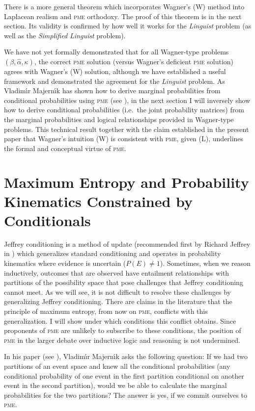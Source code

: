 \documentclass[phd,12pt,oneside]{ubcthesis}
\begin{document}
There is a more general theorem which incorporates Wagner's (W) method
into Laplacean realism and \textsc{pme} orthodoxy. The proof of this
theorem is in the next section. Its validity is confirmed by how well
it works for the \emph{Linguist} problem (as well as the
\emph{Simplified Linguist} problem).

We have not yet formally demonstrated that for all Wagner-type
problems $(\beta,\hat{\alpha},\kappa)$, the correct \textsc{pme}
solution (versus Wagner's deficient \textsc{pme} solution) agrees with
Wagner's (W) solution, although we have established a useful framework
and demonstrated the agreement for the \emph{Linguist} problem. As
Vladim{\'\i}r Majern{\'\i}k has shown how to derive marginal
probabilities from conditional probabilities using \textsc{pme} (see
), in the next section I will inversely show
how to derive conditional probabilities (i.e.\ the joint probability
matrices) from the marginal probabilities and logical relationships
provided in Wagner-type problems. This technical result together with
the claim established in the present paper that Wagner's intuition (W)
is consistent with \textsc{pme}, given (L), underlines the formal and
conceptual virtue of \textsc{pme}.

\section{Maximum Entropy and Probability Kinematics Constrained by Conditionals}
\label{sec:uodeigei}

Jeffrey conditioning is a method of update (recommended first by
Richard Jeffrey in ) which generalizes standard
conditioning and operates in probability kinematics where evidence is
uncertain ($P(E)\neq{}1$). Sometimes, when we reason inductively,
outcomes that are observed have entailment relationships with
partitions of the possibility space that pose challenges that Jeffrey
conditioning cannot meet. As we will see, it is not difficult to
resolve these challenges by generalizing Jeffrey conditioning. There
are claims in the literature that the principle of maximum entropy,
from now on \textsc{pme}, conflicts with this generalization. I will
show under which conditions this conflict obtains. Since proponents of
\textsc{pme} are unlikely to subscribe to these conditions, the
position of \textsc{pme} in the larger debate over inductive logic and
reasoning is not undermined.

In his paper  (see ),
Vladim{\'\i}r Majern{\'\i}k asks the following question: If we had two
partitions of an event space and knew all the conditional
probabilities (any conditional probability of one event in the first
partition conditional on another event in the second partition), would
we be able to calculate the marginal probabilities for the two
partitions? The answer is yes, if we commit ourselves to \textsc{pme}.
\end{document}
